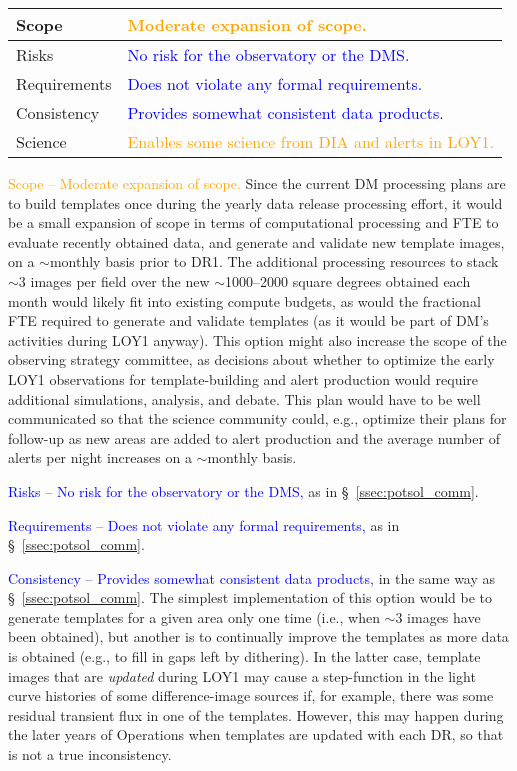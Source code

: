 \documentclass[DM,toc]{lsstdoc}
\begin{document}
\begin{center}
\begin{tabular}{|p{2.5cm}|p{13cm}|}
\hline
Scope & \textcolor{orange}{Moderate expansion of scope.} \\
\hline
Risks & \textcolor{blue}{No risk for the observatory or the DMS.} \\
\hline
Requirements & \textcolor{blue}{Does not violate any formal requirements.} \\
\hline
Consistency & \textcolor{blue}{Provides somewhat consistent data products.} \\
\hline
Science & \textcolor{orange}{Enables some science from DIA and alerts in LOY1.} \\
\hline
\end{tabular}
\end{center}

\textcolor{orange}{ Scope -- Moderate expansion of scope.}
Since the current DM processing plans are to build templates once during the yearly data release processing effort, it would be a small expansion of scope in terms of computational processing and FTE to evaluate recently obtained data, and generate and validate new template images, on a $\sim$monthly basis prior to DR1.
The additional processing resources to stack $\sim$3 images per field over the new $\sim$1000--2000 square degrees obtained each month would likely fit into existing compute budgets, as would the fractional FTE required to generate and validate templates (as it would be part of DM's activities during LOY1 anyway).
This option might also increase the scope of the observing strategy committee, as decisions about whether to optimize the early LOY1 observations for template-building and alert production would require additional simulations, analysis, and debate.
This plan would have to be well communicated so that the science community could, e.g., optimize their plans for follow-up as new areas are added to alert production and the average number of alerts per night increases on a $\sim$monthly basis.

\textcolor{blue}{ Risks -- No risk for the observatory or the DMS,} as in \S~\ref{ssec:potsol_comm}. 

\textcolor{blue}{ Requirements -- Does not violate any formal requirements,} as in \S~\ref{ssec:potsol_comm}. 

\textcolor{blue}{ Consistency -- Provides somewhat consistent data products,} in the same way as \S~\ref{ssec:potsol_comm}.
The simplest implementation of this option would be to generate templates for a given area only one time (i.e., when $\sim$3 images have been obtained), but another is to continually improve the templates as more data is obtained (e.g., to fill in gaps left by dithering).
In the latter case, template images that are {\em updated} during LOY1 may cause a step-function in the light curve histories of some difference-image sources if, for example, there was some residual transient flux in one of the templates.
However, this may happen during the later years of Operations when templates are updated with each DR, so that is not a true inconsistency.
\end{document}
